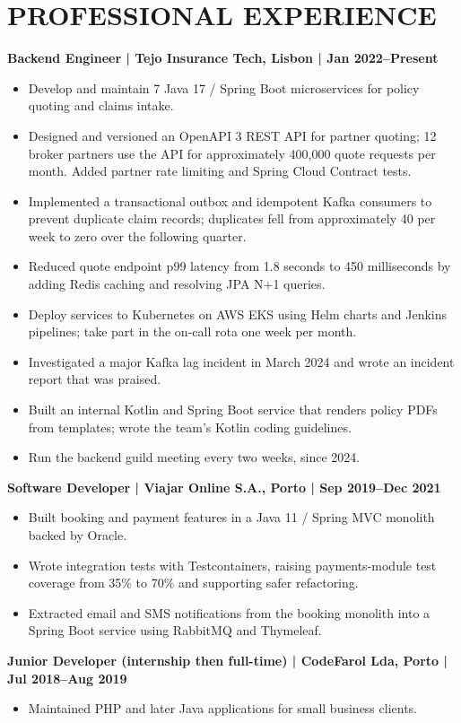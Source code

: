 \documentclass[11pt,a4paper]{article}
\begin{document}
\section*{PROFESSIONAL EXPERIENCE}
\textbf{Backend Engineer | Tejo Insurance Tech, Lisbon | Jan 2022--Present}
\begin{itemize}
\item Develop and maintain 7 Java 17 / Spring Boot microservices for policy quoting and claims intake.
\item Designed and versioned an OpenAPI 3 REST API for partner quoting; 12 broker partners use the API for approximately 400,000 quote requests per month. Added partner rate limiting and Spring Cloud Contract tests.
\item Implemented a transactional outbox and idempotent Kafka consumers to prevent duplicate claim records; duplicates fell from approximately 40 per week to zero over the following quarter.
\item Reduced quote endpoint p99 latency from 1.8 seconds to 450 milliseconds by adding Redis caching and resolving JPA N+1 queries.
\item Deploy services to Kubernetes on AWS EKS using Helm charts and Jenkins pipelines; take part in the on-call rota one week per month.
\item Investigated a major Kafka lag incident in March 2024 and wrote an incident report that was praised.
\item Built an internal Kotlin and Spring Boot service that renders policy PDFs from templates; wrote the team's Kotlin coding guidelines.
\item Run the backend guild meeting every two weeks, since 2024.
\end{itemize}

\textbf{Software Developer | Viajar Online S.A., Porto | Sep 2019--Dec 2021}
\begin{itemize}
\item Built booking and payment features in a Java 11 / Spring MVC monolith backed by Oracle.
\item Wrote integration tests with Testcontainers, raising payments-module test coverage from 35\% to 70\% and supporting safer refactoring.
\item Extracted email and SMS notifications from the booking monolith into a Spring Boot service using RabbitMQ and Thymeleaf.
\end{itemize}

\textbf{Junior Developer (internship then full-time) | CodeFarol Lda, Porto | Jul 2018--Aug 2019}
\begin{itemize}
\item Maintained PHP and later Java applications for small business clients.
\end{itemize}
\end{document}
